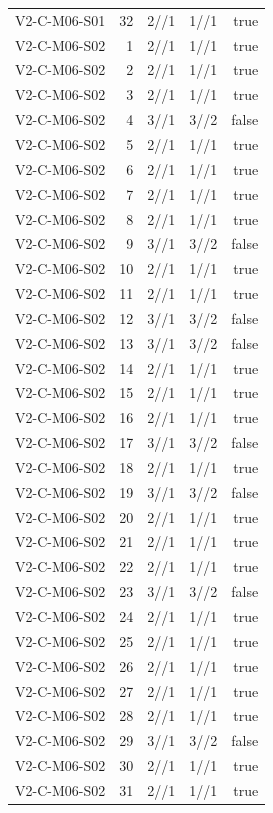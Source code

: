 {\begin{longtable}{lrrrr}
V2-C-M06-S01 & 32 & 2//1 & 1//1 & true \\
V2-C-M06-S02 & 1 & 2//1 & 1//1 & true \\
V2-C-M06-S02 & 2 & 2//1 & 1//1 & true \\
V2-C-M06-S02 & 3 & 2//1 & 1//1 & true \\
V2-C-M06-S02 & 4 & 3//1 & 3//2 & false \\
V2-C-M06-S02 & 5 & 2//1 & 1//1 & true \\
V2-C-M06-S02 & 6 & 2//1 & 1//1 & true \\
V2-C-M06-S02 & 7 & 2//1 & 1//1 & true \\
V2-C-M06-S02 & 8 & 2//1 & 1//1 & true \\
V2-C-M06-S02 & 9 & 3//1 & 3//2 & false \\
V2-C-M06-S02 & 10 & 2//1 & 1//1 & true \\
V2-C-M06-S02 & 11 & 2//1 & 1//1 & true \\
V2-C-M06-S02 & 12 & 3//1 & 3//2 & false \\
V2-C-M06-S02 & 13 & 3//1 & 3//2 & false \\
V2-C-M06-S02 & 14 & 2//1 & 1//1 & true \\
V2-C-M06-S02 & 15 & 2//1 & 1//1 & true \\
V2-C-M06-S02 & 16 & 2//1 & 1//1 & true \\
V2-C-M06-S02 & 17 & 3//1 & 3//2 & false \\
V2-C-M06-S02 & 18 & 2//1 & 1//1 & true \\
V2-C-M06-S02 & 19 & 3//1 & 3//2 & false \\
V2-C-M06-S02 & 20 & 2//1 & 1//1 & true \\
V2-C-M06-S02 & 21 & 2//1 & 1//1 & true \\
V2-C-M06-S02 & 22 & 2//1 & 1//1 & true \\
V2-C-M06-S02 & 23 & 3//1 & 3//2 & false \\
V2-C-M06-S02 & 24 & 2//1 & 1//1 & true \\
V2-C-M06-S02 & 25 & 2//1 & 1//1 & true \\
V2-C-M06-S02 & 26 & 2//1 & 1//1 & true \\
V2-C-M06-S02 & 27 & 2//1 & 1//1 & true \\
V2-C-M06-S02 & 28 & 2//1 & 1//1 & true \\
V2-C-M06-S02 & 29 & 3//1 & 3//2 & false \\
V2-C-M06-S02 & 30 & 2//1 & 1//1 & true \\
V2-C-M06-S02 & 31 & 2//1 & 1//1 & true \\

\end{longtable}}
